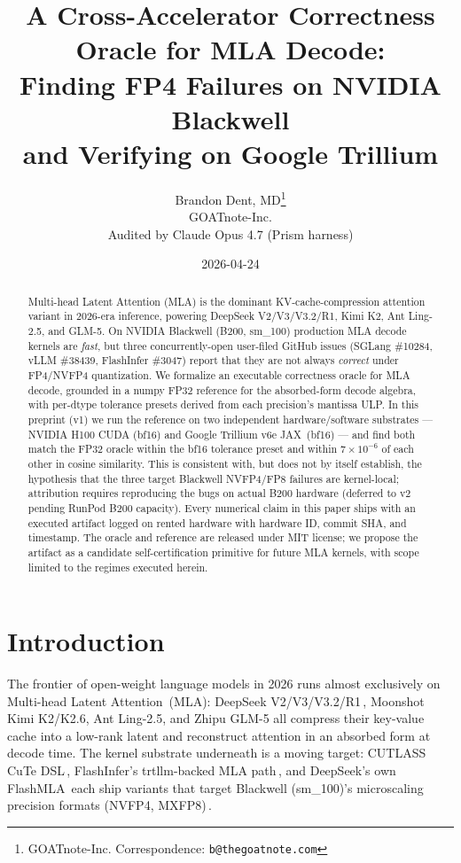 \documentclass[11pt]{article}
\title{A Cross-Accelerator Correctness Oracle for MLA Decode:\\
       Finding FP4 Failures on NVIDIA Blackwell\\
       and Verifying on Google Trillium}
\author{Brandon Dent, MD\thanks{GOATnote-Inc. Correspondence: \texttt{b@thegoatnote.com}}\\
        GOATnote-Inc.\\
        Audited by Claude Opus 4.7 (Prism harness)\\}
\date{2026-04-24}
\begin{document}
\maketitle

\begin{abstract}
Multi-head Latent Attention (MLA) is the dominant KV-cache-compression
attention variant in 2026-era inference, powering DeepSeek V2/V3/V3.2/R1,
Kimi K2, Ant Ling-2.5, and GLM-5. On NVIDIA Blackwell (B200, sm\_100)
production MLA decode kernels are \emph{fast}, but three concurrently-open
user-filed GitHub issues (SGLang \#10284, vLLM \#38439, FlashInfer \#3047)
report that they are not always \emph{correct} under FP4/NVFP4
quantization. We formalize an executable correctness oracle for MLA
decode, grounded in a numpy FP32 reference for the absorbed-form decode
algebra, with per-dtype tolerance presets derived from each precision's
mantissa ULP. In this preprint (v1) we run the reference on two
independent hardware/software substrates --- NVIDIA H100 CUDA (bf16) and
Google Trillium v6e JAX\,\citep{trillium-docs} (bf16) --- and find both match the FP32 oracle
within the bf16 tolerance preset and within $7\times 10^{-6}$ of each
other in cosine similarity. This is consistent with, but does not by
itself establish, the hypothesis that the three target Blackwell
NVFP4/FP8 failures are kernel-local; attribution requires reproducing
the bugs on actual B200 hardware (deferred to v2 pending RunPod B200
capacity). Every numerical claim in this paper ships with an executed
artifact logged on rented hardware with hardware ID, commit SHA, and
timestamp. The oracle and reference are released under MIT license; we
propose the artifact as a candidate self-certification primitive for
future MLA kernels, with scope limited to the regimes executed herein.
\end{abstract}

\section{Introduction}
\label{sec:intro}

The frontier of open-weight language models in 2026 runs almost
exclusively on Multi-head Latent Attention\,\citep{deepseekv2} (MLA):
DeepSeek V2/V3/V3.2/R1\,\citep{deepseekv3, deepseekr1-preprint, deepseekr1-nature, deepseekv32},
Moonshot Kimi K2/K2.6, Ant Ling-2.5, and Zhipu GLM-5 all compress their
key-value cache into a low-rank latent and reconstruct attention in an
absorbed form at decode time. The kernel substrate underneath is a
moving target: CUTLASS CuTe DSL\,\citep{cutlass}, FlashInfer's
trtllm-backed MLA path\,\citep{flashinfer}, and DeepSeek's own
FlashMLA\,\citep{flashmla} each ship variants that target Blackwell
(sm\_100)'s microscaling precision formats (NVFP4, MXFP8)\,\citep{nvfp4-blog}.
\end{document}

